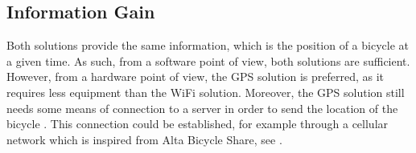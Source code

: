 \subsection{Information Gain}
Both solutions provide the same information, which is the position of a bicycle at a given time.
As such, from a software point of view, both solutions are sufficient.
However, from a hardware point of view, the GPS solution is preferred, as it requires less equipment than the WiFi solution. 
Moreover, the GPS solution still needs some means of connection to a server in order to send the location of the bicycle \citep{misc:gpsSystem}. 
This connection could be established, for example through a cellular network which is inspired from Alta Bicycle Share, see .
